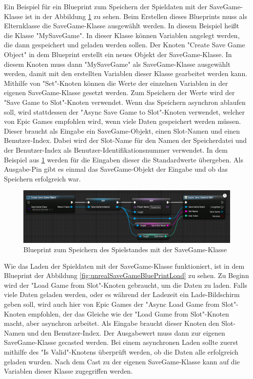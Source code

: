 Ein Beispiel für ein Blueprint zum Speichern der Spieldaten mit der SaveGame-Klasse ist in der Abbildung \ref{fig:unrealSaveGameBluePrintSave} zu sehen. Beim Erstellen dieses Blueprints muss als Elternklasse die SaveGame-Klasse ausgewählt werden. In diesem Beispiel heißt die Klasse "MySaveGame". In dieser Klasse können Variablen angelegt werden, die dann gespeichert und geladen werden sollen. Der Knoten "Create Save Game Object" in dem Blueprint erstellt ein neues Objekt der SaveGame-Klasse. In diesem Knoten muss dann "MySaveGame" als SaveGame-Klasse ausgewählt werden, damit mit den erstellten Variablen dieser Klasse gearbeitet werden kann. Mithilfe von "Set"-Knoten können die Werte der einzelnen Variablen in der eigenen SaveGame-Klasse gesetzt werden. Zum Speichern der Werte wird der "Save Game to Slot"-Knoten verwendet. Wenn das Speichern asynchron ablaufen soll, wird stattdessen der "Async Save Game to Slot"-Knoten verwendet, welcher von Epic Games empfohlen wird, wenn viele Daten gespeichert werden müssen. Dieser braucht als Eingabe ein SaveGame-Objekt, einen Slot-Namen und einen Benutzer-Index. Dabei wird der Slot-Name für den Namen der Speicherdatei und der Benutzer-Index als Benutzer-Identifikationsnummer verwendet. In dem Beispiel aus \ref{fig:unrealSaveGameBluePrintSave} werden für die Eingaben dieser die Standardwerte übergeben. Als Ausgabe-Pin gibt es einmal das SaveGame-Objekt der Eingabe und ob das Speichern erfolgreich war.\cite{unrealengineSavingLoading}

\begin{figure}[htp]
    \centering
    \includegraphics[width=1\textwidth]{images/SaveGameBP.png}
    \caption{Blueprint zum Speichern des Spielstandes mit der SaveGame-Klasse \cite{unrealengineSavingLoading}}
    \label{fig:unrealSaveGameBluePrintSave}
\end{figure}

Wie das Laden der Spieldaten mit der SaveGame-Klasse funktioniert, ist in dem Blueprint der Abbildung \ref{fig:unrealSaveGameBluePrintLoad} zu sehen. Zu Beginn wird der "Load Game from Slot"-Knoten gebraucht, um die Daten zu laden. Falls viele Daten geladen werden, oder es während der Ladezeit ein Lade-Bildschirm geben soll, wird auch hier von Epic Games der "Async Load Game from Slot"-Knoten empfohlen, der das Gleiche wie der "Load Game from Slot"-Knoten macht, aber asynchron arbeitet. Als Eingabe braucht dieser Knoten den Slot-Namen und den Benutzer-Index. Der Ausgabewert muss dann zur eigenen SaveGame-Klasse gecasted werden. Bei einem asynchronen Laden sollte zuerst mithilfe des "Is Valid"-Knotens überprüft werden, ob die Daten alle erfolgreich geladen wurden. Nach dem Cast zu der eigenen SaveGame-Klasse kann auf die Variablen dieser Klasse zugegriffen werden.\cite{unrealengineSavingLoading}

